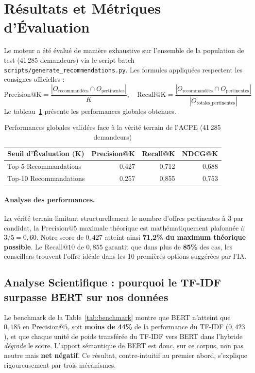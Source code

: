 \documentclass[11pt,a4paper]{article}
\begin{document}
\section{Résultats et Métriques d'Évaluation}
\label{sec:resultats}
Le moteur a été évalué de manière exhaustive sur l'ensemble de la population de test (41\,285
demandeurs) via le script batch \texttt{scripts/generate\_recommendations.py}. Les formules
appliquées respectent les consignes officielles :
\begin{equation}
\mathrm{Precision@K} = \frac{|O_{\text{recommandées}} \cap O_{\text{pertinentes}}|}{K}, \quad
\mathrm{Recall@K} = \frac{|O_{\text{recommandées}} \cap O_{\text{pertinentes}}|}{|O_{\text{totales\_pertinentes}}|}
\end{equation}
Le tableau~\ref{tab:perf} présente les performances globales obtenues.

\begin{table}[h]
\centering
\caption{Performances globales validées face à la vérité terrain de l'ACPE (41\,285 demandeurs)}
\label{tab:perf}
\small
\begin{tabular}{@{}lrrr@{}}
\toprule
\textbf{Seuil d'Évaluation (K)} & \textbf{Precision@K} & \textbf{Recall@K} & \textbf{NDCG@K} \\
\midrule
Top-5 Recommandations  & 0,427 & 0,712 & 0,688 \\
Top-10 Recommandations & 0,257 & 0,855 & 0,753 \\
\bottomrule
\end{tabular}
\end{table}

\paragraph{Analyse des performances.} La vérité terrain limitant structurellement le nombre
d'offres pertinentes à 3 par candidat, la $\mathrm{Precision@5}$ maximale théorique est
mathématiquement plafonnée à $3/5 = 0{,}60$. Notre score de $0{,}427$ atteint ainsi
\textbf{71,2\% du maximum théorique possible}. Le $\mathrm{Recall@10}$ de $0{,}855$ garantit que
dans plus de \textbf{85\%} des cas, les conseillers trouvent l'offre idéale dans les 10 premières
options suggérées par l'IA.

\subsection{Analyse Scientifique : pourquoi le TF-IDF surpasse BERT sur nos données}
\label{sec:analyse}
Le benchmark de la Table~\ref{tab:benchmark} montre que BERT n'atteint que $0{,}185$ en
$\mathrm{Precision@5}$, soit \textbf{moins de 44\%} de la performance du TF-IDF ($0{,}423$), et que
chaque unité de poids transférée du TF-IDF vers BERT dans l'hybride \emph{dégrade} le score.
L'apport sémantique de BERT est donc, sur ce corpus, non pas neutre mais \textbf{net négatif}.
Ce résultat, contre-intuitif au premier abord, s'explique rigoureusement par trois mécanismes.
\end{document}
